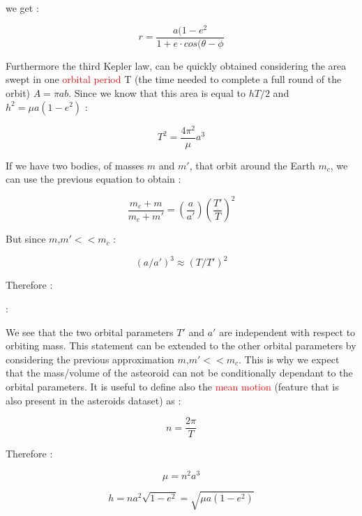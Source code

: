 \documentclass[12pt,%
               a4paper,%
               oneside,openany,%
               titlepage,%
               headinclude,footinclude,%
               BCOR5mm,%
               cleardoublepage=empty,%
               tablecaptionabove,%
               floatperchapter,
               ]{scrreprt}                 %
\begin{document}
we get \cite{murray1999solar}:

\begin{equation}
r=\frac{a(1-e^{2}}{1+e\cdot cos(\theta-\phi}
\label{eq-mot}
\end{equation}

Furthermore the third Kepler law, can be quickly obtained considering the area swept in one \textcolor{red}{orbital period} T (the time needed to complete a full round of the orbit) $A=\pi ab$. Since we know that this area is equal to $hT/2$ and $h^{2}=\mu a(1-e^{2})$ \cite{murray1999solar}:

\begin{equation}
T^{2}=\dfrac{4\pi^{2}}{\mu}a^{3}
\end{equation}

If we have two bodies, of masses $m$ and $m'$, that orbit around the Earth $m_{c}$, we can use the previous equation to obtain \cite{murray1999solar}:

\begin{equation}
\frac{m_{c}+m}{m_{c}+m'}=\left(\frac{a}{a'}\right)\left(\frac{T'}{T}\right)^{2}
\end{equation}

But since $m$,$m'<<m_{c}$ \cite{murray1999solar}:

\begin{equation}
(a/a')^{3}\approx(T/T')^{2}
\end{equation}

Therefore \cite{murray1999solar}:

\cite{murray1999solar}:

We see that the two orbital parameters $T'$ and $a'$ are independent with respect to orbiting mass. This statement can be extended to the other orbital parameters by considering the previous approximation $m$,$m'<<m_{c}$. This is why we expect that the mass/volume of the asteoroid can not be conditionally dependant to the orbital parameters. It is useful to define also the \textcolor{red}{mean motion} (feature that is also present in the asteroids dataset) as \cite{murray1999solar}:

\begin{equation}
n=\frac{2\pi}{T}
\end{equation}

Therefore \cite{murray1999solar}:

\begin{equation}
\mu=n^{2}a^{3}
\end{equation}

\begin{equation}
h=na^{2}\sqrt{1-e^{2}}=\sqrt{\mu a(1-e^{2})}
\label{eq_h}
\end{equation}
\end{document}
